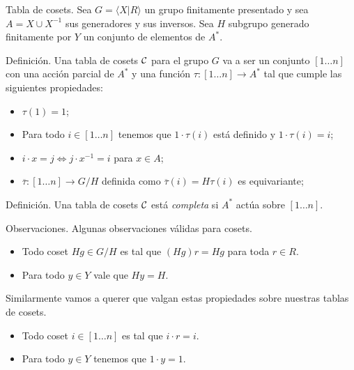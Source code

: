 \documentclass[aspectratio=169, 9pt]{beamer}
\newcommand{\fp}{finitamente presentado }
\newcommand{\In}{[1 \dots n]}
\newcommand{\ol}{\overline}
\newcommand{\Co}{{\cal{C}}}
\begin{document}
\begin{frame}[fragile]{Tabla de cosets.}
Sea $G = \langle X | R \rangle$ un grupo \fp y sea $A = X \cup X^{-1}$ sus generadores y sus inversos.
Sea $H$ subgrupo generado finitamente por $Y$ un conjunto de elementos de $A^*$.
\pause
\begin{alertblock}{Definición.}
	Una tabla de cosets $\Co $ para el grupo $G$ va a ser un conjunto $\In$ con una acción parcial de $A^{*}$ y una función $\tau: \In \to A^*$ tal que cumple las siguientes propiedades:
	\begin{itemize}
		\item $\tau(1)  = 1$;
		\item Para todo $i \in \In$ tenemos que $1\cdot {\tau(i)}$ está definido y $1\cdot {\tau(i)} = i$;
		\item $i \cdot x = j \iff j \cdot x^{-1} = i$ para $x \in A$;
		\item $\ol \tau: \In \to G/H$ definida como $\ol \tau (i) = H \tau (i)$ es equivariante;
	\end{itemize}	
\end{alertblock}
\pause
%	


\begin{alertblock}{Definición.}
	Una tabla de cosets $\Co$ está \emph{completa} si $A^*$ actúa sobre $\In$.
\end{alertblock}

\end{frame}

\begin{frame}[fragile]{Observaciones.}
	Algunas observaciones válidas para cosets.
	\pause
	\begin{itemize}		
		\item Todo coset $Hg \in G/H$ es tal que $(Hg)r = Hg$ para toda $r \in R$.
		
		\item Para todo $y \in Y$ vale que $Hy = H$.
	\end{itemize}	
	\pause
	Similarmente vamos a querer que valgan estas propiedades sobre nuestras tablas de cosets.
	\begin{itemize}
		\item Todo coset $i \in \In$ es tal que $i \cdot r = i$.
		
		\item Para todo $y \in Y$ tenemos que $1 \cdot y = 1$.
	\end{itemize}
\end{frame}
\end{document}
